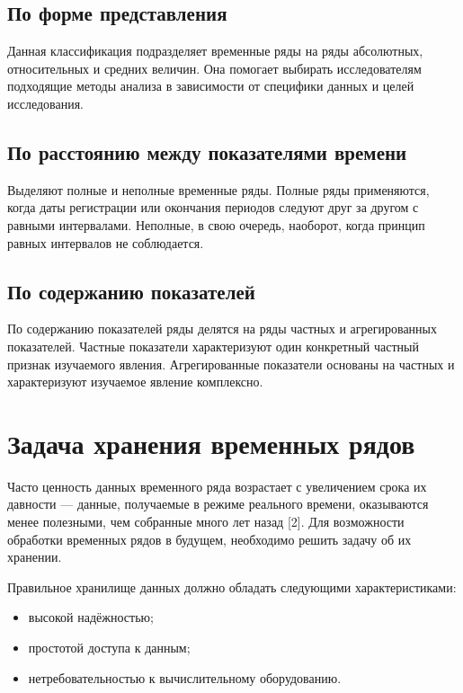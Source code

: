 \subsection{По форме представления}

Данная классификация подразделяет временные ряды на ряды абсолютных, относительных и средних
величин. Она помогает выбирать исследователям подходящие методы анализа в зависимости от специфики 
данных и целей исследования.

\subsection{По расстоянию между показателями времени}

Выделяют полные и неполные временные ряды. Полные ряды применяются, когда даты регистрации или 
окончания периодов следуют друг за другом с равными интервалами. Неполные, в свою очередь, наоборот,
когда принцип равных интервалов не соблюдается. 

\subsection{По содержанию показателей}

По содержанию показателей ряды делятся на ряды частных и агрегированных показателей.
Частные показатели характеризуют один конкретный частный признак изучаемого явления. Агре­гированные 
показатели основаны на частных и характеризуют изу­чаемое явление комплексно.

\section{Задача хранения временных рядов}

Часто ценность данных временного ряда возрастает с увеличением срока их давности — данные, 
получаемые в режиме реального времени, оказываются менее полезными, чем собранные много лет назад [2]. 
Для возможности обработки временных рядов в будущем, необходимо решить задачу об их хранении.

Правильное хранилище данных должно обладать следующими характеристиками:

\begin{itemize}[label=—]
	\item высокой надёжностью;
	\item простотой доступа к данным;
	\item нетребовательностью к вычислительному оборудованию.
\end{itemize}

